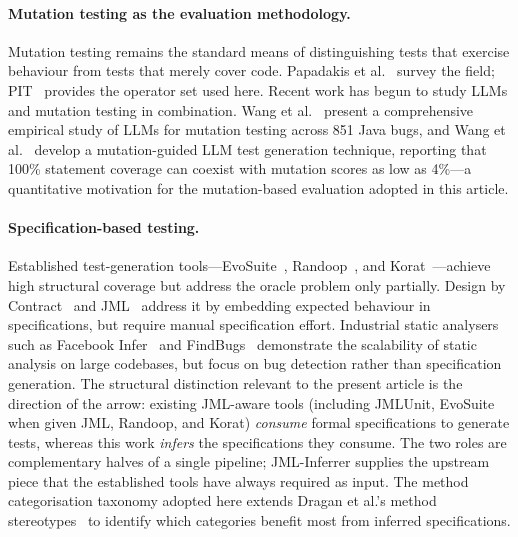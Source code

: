 \paragraph{Mutation testing as the evaluation methodology.}
Mutation testing remains the standard means of distinguishing tests that exercise behaviour from tests that merely cover code. Papadakis et al.~\cite{papadakis2019mutation} survey the field; PIT~\cite{coles2016pitest} provides the operator set used here. Recent work has begun to study LLMs and mutation testing in combination. Wang et al.~\cite{wang2024llmmutation} present a comprehensive empirical study of LLMs for mutation testing across 851 Java bugs, and Wang et al.~\cite{wang2025mutgen} develop a mutation-guided LLM test generation technique, reporting that 100\% statement coverage can coexist with mutation scores as low as 4\%---a quantitative motivation for the mutation-based evaluation adopted in this article.

\paragraph{Specification-based testing.}
Established test-generation tools---EvoSuite~\cite{fraser2011evosuite}, Randoop~\cite{pacheco2007randoop}, and Korat~\cite{boyapati2002korat}---achieve high structural coverage but address the oracle problem only partially. Design by Contract~\cite{meyer1992design} and JML~\cite{jml, leavens2006design} address it by embedding expected behaviour in specifications, but require manual specification effort. Industrial static analysers such as Facebook Infer~\cite{calcagno2015infer} and FindBugs~\cite{hovemeyer2004finding} demonstrate the scalability of static analysis on large codebases, but focus on bug detection rather than specification generation. The structural distinction relevant to the present article is the direction of the arrow: existing JML-aware tools (including JMLUnit, EvoSuite when given JML, Randoop, and Korat) \emph{consume} formal specifications to generate tests, whereas this work \emph{infers} the specifications they consume. The two roles are complementary halves of a single pipeline; JML-Inferrer supplies the upstream piece that the established tools have always required as input. The method categorisation taxonomy adopted here extends Dragan et al.'s method stereotypes~\cite{dragan2006reverse} to identify which categories benefit most from inferred specifications.
